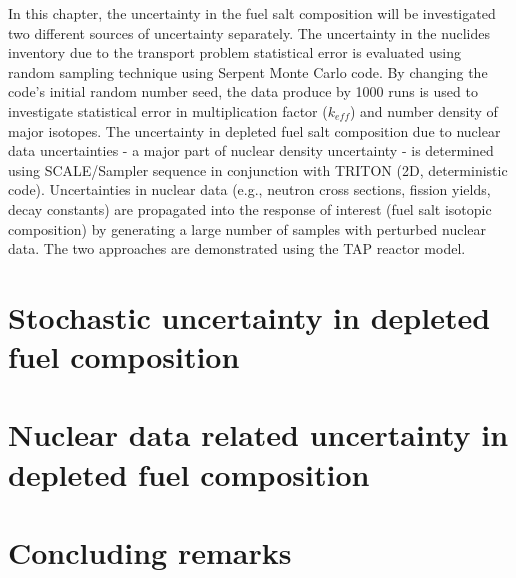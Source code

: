 In this chapter, the uncertainty in the fuel salt composition will be 
investigated two different sources of uncertainty separately. The uncertainty 
in the nuclides inventory due to the transport problem statistical error is 
evaluated using random sampling technique using Serpent Monte Carlo code. By 
changing the code's initial random number seed, the data produce by 1000 runs 
is used to investigate statistical error in multiplication factor ($k_{eff}$) 
and number density of major isotopes. The uncertainty in depleted fuel salt 
composition due to nuclear data uncertainties - a major part of nuclear 
density uncertainty - is determined using SCALE/Sampler sequence in 
conjunction with TRITON (2D, deterministic code). Uncertainties in nuclear
data (e.g., neutron cross sections, fission yields, decay constants) are 
propagated into the response of
interest (fuel salt isotopic composition) by 
generating a large number of samples with perturbed nuclear data. The two 
approaches are demonstrated
using the \gls{TAP} reactor model.






\section{Stochastic uncertainty in depleted fuel composition}

\section{Nuclear data related uncertainty in depleted fuel composition}

\section{Concluding remarks}